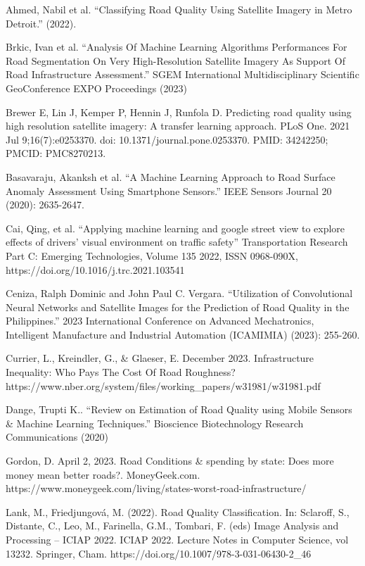 \documentclass{article}
\begin{document}
\begin{hangparas}{.3in}{1}
{
\small
Ahmed, Nabil et al. “Classifying Road Quality Using Satellite Imagery in Metro Detroit.” (2022).

Brkic, Ivan et al. “Analysis Of Machine Learning Algorithms Performances For Road Segmentation On Very High-Resolution Satellite Imagery As Support Of Road Infrastructure Assessment.” SGEM International Multidisciplinary Scientific GeoConference EXPO Proceedings (2023)

Brewer E, Lin J, Kemper P, Hennin J, Runfola D. Predicting road quality using high resolution satellite imagery: A transfer learning approach. PLoS One. 2021 Jul 9;16(7):e0253370. doi: 10.1371/journal.pone.0253370. PMID: 34242250; PMCID: PMC8270213.

Basavaraju, Akanksh et al. “A Machine Learning Approach to Road Surface Anomaly Assessment Using Smartphone Sensors.” IEEE Sensors Journal 20 (2020): 2635-2647.

Cai, Qing, et al. “Applying machine learning and google street view to explore effects of drivers’ visual environment on traffic safety” Transportation Research Part C: Emerging Technologies, Volume 135 2022, ISSN 0968-090X, https://doi.org/10.1016/j.trc.2021.103541

Ceniza, Ralph Dominic and John Paul C. Vergara. “Utilization of Convolutional Neural Networks and Satellite Images for the Prediction of Road Quality in the Philippines.” 2023 International Conference on Advanced Mechatronics, Intelligent Manufacture and Industrial Automation (ICAMIMIA) (2023): 255-260.

Currier, L., Kreindler, G., \& Glaeser, E. December 2023. Infrastructure Inequality: Who Pays The Cost Of Road Roughness? https://www.nber.org/system/files/working\_papers/w31981/w31981.pdf

Dange, Trupti K.. “Review on Estimation of Road Quality using Mobile Sensors \& Machine Learning Techniques.” Bioscience Biotechnology Research Communications (2020)

Gordon, D. April 2, 2023. Road Conditions \& spending by state: Does more money mean better roads?. MoneyGeek.com. https://www.moneygeek.com/living/states-worst-road-infrastructure/

Lank, M., Friedjungová, M. (2022). Road Quality Classification. In: Sclaroff, S., Distante, C., Leo, M., Farinella, G.M., Tombari, F. (eds) Image Analysis and Processing – ICIAP 2022. ICIAP 2022. Lecture Notes in Computer Science, vol 13232. Springer, Cham. https://doi.org/10.1007/978-3-031-06430-2\_46

}
\end{hangparas}
\end{document}
